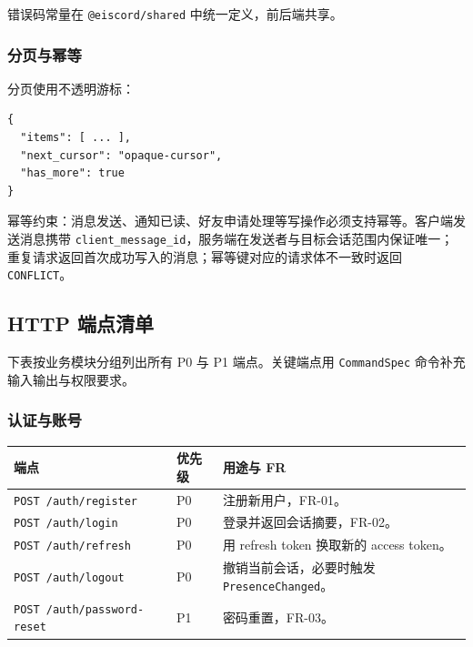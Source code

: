 错误码常量在 \texttt{@eiscord/shared} 中统一定义，前后端共享。

\subsubsection{分页与幂等}
分页使用不透明游标：

\begin{verbatim}
{
  "items": [ ... ],
  "next_cursor": "opaque-cursor",
  "has_more": true
}
\end{verbatim}

幂等约束：消息发送、通知已读、好友申请处理等写操作必须支持幂等。客户端发送消息携带 \texttt{client\_message\_id}，服务端在发送者与目标会话范围内保证唯一；重复请求返回首次成功写入的消息；幂等键对应的请求体不一致时返回 \texttt{CONFLICT}。

\subsection{HTTP 端点清单}

下表按业务模块分组列出所有 P0 与 P1 端点。关键端点用 \texttt{CommandSpec} 命令补充输入输出与权限要求。

\subsubsection{认证与账号}

\noindent\begin{tabularx}{\textwidth}{L{6.4cm}L{2.2cm}Y}
  \toprule
  端点 & 优先级 & 用途与 FR \\
  \midrule
  \texttt{POST /auth/register} & P0 & 注册新用户，FR-01。 \\
  \texttt{POST /auth/login} & P0 & 登录并返回会话摘要，FR-02。 \\
  \texttt{POST /auth/refresh} & P0 & 用 refresh token 换取新的 access token。 \\
  \texttt{POST /auth/logout} & P0 & 撤销当前会话，必要时触发 \texttt{PresenceChanged}。 \\
  \texttt{POST /auth/password-reset} & P1 & 密码重置，FR-03。 \\
  \bottomrule
\end{tabularx}


